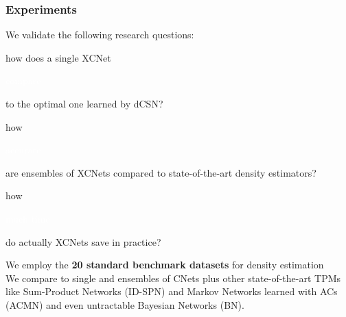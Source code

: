 \documentclass[xcolor={usenames,dvipsnames,svgnames}, compress]{beamer}
\newcommand{\highlighttext}[2][yellow]{{\colorbox{#1}{\strut\textcolor{white}{#2}}}}
\begin{document}
  \begin{frame}[t]
    \small
    \frametitle{Experiments}
    We validate the following research questions:
    \begin{center}
      \begin{minipage}{0.9\linewidth}
        \begin{description}[align=parright]
          \setlength{\itemsep}{-2pt}
        \item[\textbf{(Q1)}]
          how does a single XCNet \highlighttext[lacamlilac]{compare} to the optimal one learned by
\textsf{dCSN}?
        \item[\textbf{(Q2)}]
          how \highlighttext[lacamlilac]{accurate} are ensembles of
          XCNets compared to
state-of-the-art density estimators? 
        \item[\textbf{(Q3)}]
          how \highlighttext[gold4]{much time} do actually XCNets save in practice?
        \end{description}
      \end{minipage}
    \end{center}\vspace{10pt}

    We employ the \textbf{20 standard benchmark datasets} for density
    estimation~\emph{\parencite{Haaren2012,Vergari2015}}\\[10pt]

    We compare to single and ensembles of CNets plus other
    state-of-the-art  TPMs like
    Sum-Product Networks (\textsf{ID-SPN}) and Markov Networks learned
    with ACs (\textsf{ACMN}) and even untractable Bayesian Networks (\textsf{BN}).
    
  \end{frame}
\end{document}
